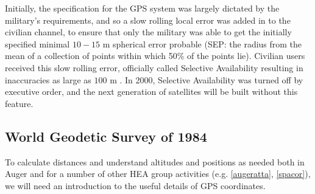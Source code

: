 Initially, the specification for the GPS system was largely dictated by the military's requirements, and so a slow rolling local error was added in to the civilian channel, to ensure that only the military was able to get the initially specified minimal $10-15$ m spherical error probable (SEP: the radius from the mean of a collection of points within which 50\% of the points lie). Civilian users received this slow rolling error, officially called Selective Availability resulting in inaccuracies as large as $100$ m \cite{thompson}.  In 2000, Selective Availability was turned off by executive order, and the next generation of satellites will be built without this feature. %

\subsection{World Geodetic Survey of 1984}
\label{wgs84}
To calculate distances and understand altitudes and positions as needed both in Auger and for a number of other HEA group activities (e.g. \autoref{augeratta}, \autoref{spacor}), we will need an introduction to the useful details of GPS coordinates.

